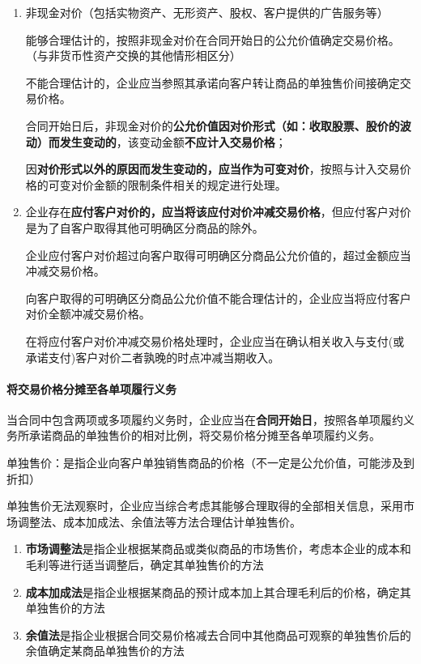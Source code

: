 \documentclass[UTF8,12pt]{ctexart}
\numberwithin{equation}{section} %
\numberwithin{figure}{section}
\numberwithin{table}{section}
\begin{document}
\begin{enumerate}
\begin{enumerate}
			\item 在某些交易中企业向客户转让商品或服务的时间与收款的时间间隔可能较长，而导致该时间间隔的主要原因是国家有关部门需要履行相关的审批程序，且该时间间隔是履行上述程序所需经历的必要时间，其性质并非是提供融资利益企业从事新能源汽车的生产与销售：作为销售对价组成部分的补贴款的收取时间与企业确认收入的时间间隔可能超过一年
		\end{enumerate}
		
		\item 非现金对价（包括实物资产、无形资产、股权、客户提供的广告服务等）
		
		能够合理估计的，按照非现金对价在合同开始日的公允价值确定交易价格。（与非货币性资产交换的其他情形相区分）

		不能合理估计的，企业应当参照其承诺向客户转让商品的单独售价间接确定交易价格。
		
		合同开始日后，非现金对价的\textbf{公允价值因对价形式（如：收取股票、股价的波动）而发生变动的}，该变动金额\textbf{不应计入交易价格}；
		
		因\textbf{对价形式以外的原因而发生变动的，应当作为可变对价}，按照与计入交易价格的可变对价金额的限制条件相关的规定进行处理。
		
		\item 企业存在\textbf{应付客户对价的，应当将该应付对价冲减交易价格}，但应付客户对价是为了自客户取得其他可明确区分商品的除外。
		
		企业应付客户对价超过向客户取得可明确区分商品公允价值的，超过金额应当冲减交易价格。
		
		向客户取得的可明确区分商品公允价值不能合理估计的，企业应当将应付客户对价全额冲减交易价格。
		
		在将应付客户对价冲减交易价格处理时，企业应当在确认相关收入与支付(或承诺支付)客户对价二者孰晚的时点冲减当期收入。
		
	\end{enumerate}
	\paragraph{将交易价格分摊至各单项履行义务}
	当合同中包含两项或多项履约义务时，企业应当在\textbf{合同开始日}，按照各单项履约义务所承诺商品的单独售价的相对比例，将交易价格分摊至各单项履约义务。
	
	单独售价：是指企业向客户单独销售商品的价格（不一定是公允价值，可能涉及到折扣）
	
	单独售价无法观察时，企业应当综合考虑其能够合理取得的全部相关信息，采用市场调整法、成本加成法、余值法等方法合理估计单独售价。
	\begin{enumerate}
		\item \textbf{市场调整法}是指企业根据某商品或类似商品的市场售价，考虑本企业的成本和毛利等进行适当调整后，确定其单独售价的方法
		
		\item \textbf{成本加成法}是指企业根据某商品的预计成本加上其合理毛利后的价格，确定其单独售价的方法
		
		\item \textbf{余值法}是指企业根据合同交易价格减去合同中其他商品可观察的单独售价后的余值确定某商品单独售价的方法
	\end{enumerate}
	
\end{document}
